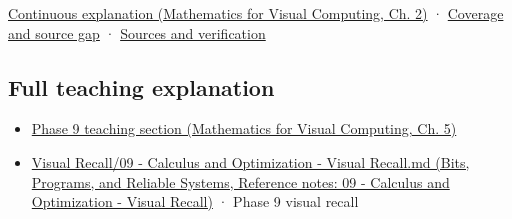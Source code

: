 \hypertarget{appendix-ab31ef447dbf-source-and-navigation}{}

\href{../02-Mathematics-for-Visual-Computing/main.pdf\#nameddest=01-foundations-i-ch018-keep-the-promises-visible-while-moving-between-representations}{Continuous explanation (Mathematics for Visual Computing, Ch. 2)} · \hyperref[appendix-fd090d982a15-phase-7---parts-601-700]{Coverage and source gap} · \hyperref[appendix-a103e7846d21-phase-7---source-analysis-and-verification]{Sources and verification}

\subsection{Full teaching explanation}\label{appendix-ab31ef447dbf-full-teaching-explanation}

\hypertarget{appendix-ab31ef447dbf-full-teaching-explanation}{}

\begin{itemize}
\tightlist
\item
  \href{../02-Mathematics-for-Visual-Computing/main.pdf\#nameddest=02-foundations-ii-ch021-jacobians-curvature-and-local-approximation}{Phase 9 teaching section (Mathematics for Visual Computing, Ch. 5)}
\item
  \href{../01-Bits-Programs-and-Reliable-Systems/main.pdf\#nameddest=appendix-adf48f5dc5c1}{Visual Recall/09 - Calculus and Optimization - Visual Recall.md (Bits, Programs, and Reliable Systems, Reference notes: 09 - Calculus and Optimization - Visual Recall)} · Phase 9 visual recall
\end{itemize}
